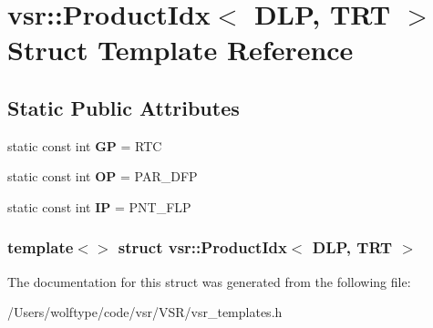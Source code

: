\hypertarget{structvsr_1_1_product_idx_3_01_d_l_p_00_01_t_r_t_01_4}{\section{vsr\-:\-:Product\-Idx$<$ D\-L\-P, T\-R\-T $>$ Struct Template Reference}
\label{structvsr_1_1_product_idx_3_01_d_l_p_00_01_t_r_t_01_4}
}
\subsection*{Static Public Attributes}
\begin{DoxyCompactItemize}
\item 
\hypertarget{structvsr_1_1_product_idx_3_01_d_l_p_00_01_t_r_t_01_4_ab05137400512505218584bc486cb2177}{static const int {\bfseries G\-P} = R\-T\-C}\label{structvsr_1_1_product_idx_3_01_d_l_p_00_01_t_r_t_01_4_ab05137400512505218584bc486cb2177}

\item 
\hypertarget{structvsr_1_1_product_idx_3_01_d_l_p_00_01_t_r_t_01_4_a48c99fdc7ac1ce077f51c28a17fa3718}{static const int {\bfseries O\-P} = P\-A\-R\-\_\-\-D\-F\-P}\label{structvsr_1_1_product_idx_3_01_d_l_p_00_01_t_r_t_01_4_a48c99fdc7ac1ce077f51c28a17fa3718}

\item 
\hypertarget{structvsr_1_1_product_idx_3_01_d_l_p_00_01_t_r_t_01_4_aaeb59936c18948fadd3790ac4c5e4c5c}{static const int {\bfseries I\-P} = P\-N\-T\-\_\-\-F\-L\-P}\label{structvsr_1_1_product_idx_3_01_d_l_p_00_01_t_r_t_01_4_aaeb59936c18948fadd3790ac4c5e4c5c}

\end{DoxyCompactItemize}
\subsubsection*{template$<$$>$ struct vsr\-::\-Product\-Idx$<$ D\-L\-P, T\-R\-T $>$}



The documentation for this struct was generated from the following file\-:\begin{DoxyCompactItemize}
\item 
/\-Users/wolftype/code/vsr/\-V\-S\-R/vsr\-\_\-templates.\-h\end{DoxyCompactItemize}

